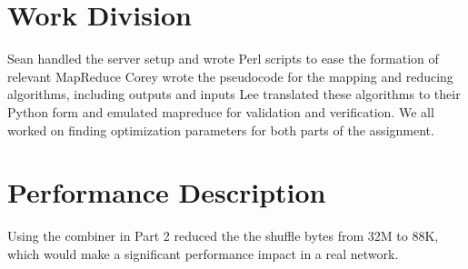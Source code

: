 \documentclass[14pt]{extarticle}
\begin{document}
\section{Work Division}
Sean handled the server setup and wrote Perl scripts to ease the formation of relevant MapReduce 
Corey wrote the pseudocode for the mapping and reducing algorithms, including outputs and inputs
Lee translated these algorithms to their Python form and emulated mapreduce for validation and verification. 
We all worked on finding optimization parameters for both parts of the assignment. 

\section{Performance Description}
Using the combiner in Part 2 reduced the the shuffle bytes from 32M to 88K, which
would make a significant performance impact in a real network.
\end{document}
